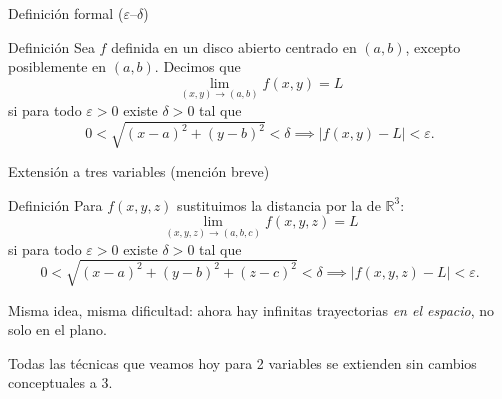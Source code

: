 \documentclass[11pt,aspectratio=169]{beamer}
\begin{document}
\begin{frame}{Definición formal ($\varepsilon$--$\delta$)}
  \begin{block}{Definición}
    Sea $f$ definida en un disco abierto centrado en $(a,b)$, excepto posiblemente en $(a,b)$. Decimos que
    \[
      \lim_{(x,y)\to(a,b)} f(x,y)=L
    \]
    si para todo $\varepsilon>0$ existe $\delta>0$ tal que
    \[
      0<\sqrt{(x-a)^2+(y-b)^2}<\delta
      \implies
      |f(x,y)-L|<\varepsilon.
    \]
  \end{block}
  \pause
  \vspace{-6pt}
  \begin{center}
  \end{center}
\end{frame}

\begin{frame}{Extensión a tres variables (mención breve)}
  \begin{block}{Definición}
    Para $f(x,y,z)$ sustituimos la distancia por la de $\mathbb R^3$:
    \[
      \lim_{(x,y,z)\to(a,b,c)} f(x,y,z)=L
    \]
    si para todo $\varepsilon>0$ existe $\delta>0$ tal que
    \[
      0<\sqrt{(x-a)^2+(y-b)^2+(z-c)^2}<\delta
      \implies
      |f(x,y,z)-L|<\varepsilon.
    \]
  \end{block}
  \pause
  \begin{center}
  \normalsize Misma idea, misma dificultad: ahora hay infinitas trayectorias \emph{en el espacio}, no solo en el plano.
  \end{center}
  \pause
  \vspace{4pt}
  \begin{center}\small\color{gray60} Todas las técnicas que veamos hoy para 2 variables se extienden sin cambios conceptuales a 3.\end{center}
\end{frame}
\end{document}
